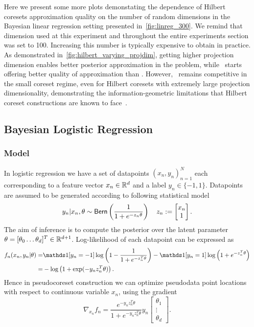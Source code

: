 Here we present some more plots demonstating the dependence of Hilbert coresets approximation quality on the number of random dimensions in the Bayesian linear regression setting presented in~\cref{fig:linreg_300}. We remind that dimension used at this experiment and throughout the entire experiments section was set to 100. Increasing this number is typically expensive to obtain in practice. As demonstrated in~\cref{fig:hilbert_varying_projdim}, getting higher projection dimension enables better posterior approximation in the problem, while \gigao~starts offering better quality of approximation than \gigar. However, \psvi~remains competitive in the small coreset regime, even for Hilbert coresets with extremely large projection dimensionality, demonstrating the information-geometric limitations that Hilbert coreset constructions are known to face~\cite{campbell19neurips}.


\subsection{Bayesian Logistic Regression}
\label{app:logreg_experiment_appendix}

\subsubsection{Model}
\label{app:logreg_model_appendix}
In logistic regression we have a set of datapoints $(x_n, y_n)_{n=1}^{N}$ each corresponding to a feature vector ${x_n \in \mathbb{R}^d}$ and a label ${y_n \in \{-1, 1\}}$. Datapoints are assumed to be generated according to following statistical model
\[
y_n | x_n, \theta \sim {\sf{Bern}} \left( \frac{1}{1+e^{-z_n \theta}} \right) 
\quad 
z_n := \begin{bmatrix}
x_n \\
1
\end{bmatrix}.
\label{eq:logreg-model}
\]
The aim of inference is to compute the posterior over the latent parameter $ \theta = [\theta_0 \ldots \theta_d]^T \in \mathbb{R}^{d+1}$.
Log-likelihood of each datapoint can be expressed as
\[
\begin{split}
f_n(x_n, y_n|\theta)  
=&\ind{[y_n=-1]}\log \left( 1 - \frac{1}{1+e^{-z_n^T \theta}}\right) 
- \ind{[y_n=1]} \log \left( 1+ e^{-z_n^T \theta}  \right) \\
=&-\log\left( 1 + \exp(-y_n z_n^T\theta)\right).
\label{eq:logreg-loglik}
\end{split}
\]
Hence in pseudocoreset construction we can optimize pseudodata point locations with respect to continuous variable $ x_n$, using the gradient
\[
\nabla_{x_n}f_n =  \frac{e^{-y_n z_n^T \theta}}{1+e^{-y_n z_n^T \theta}}y_n \begin{bmatrix}
\theta_1 \\
\vdots \\
\theta_d
\end{bmatrix}.
\label{eq:logreg-loglik-locgrad}
\]



